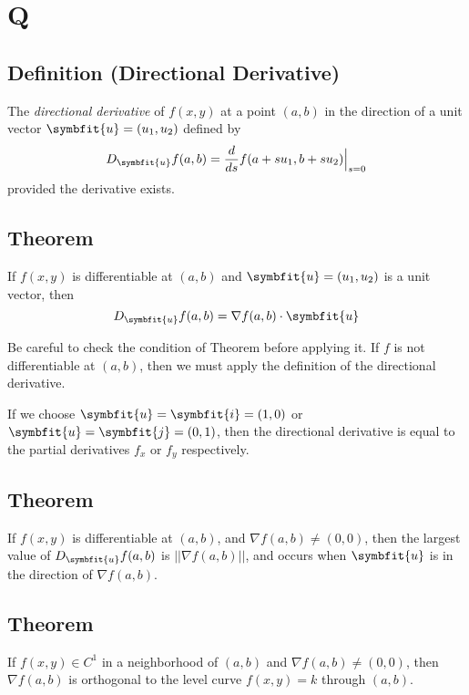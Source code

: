 \section{Q}
\begin{defbox}
\subsection{Definition (Directional Derivative)}
The \emph{directional derivative} of $ f(x,y) $ at a point $ (a,b) $ 
in the direction of a unit vector $ \symbfit{u}=(u_1,u_2) $ 
defined by
\[ D_{\symbfit{u}}f(a,b)=
\frac{d}{ds} f(a+su_1,b+su_2)\Bigr\rvert_{s=0} \]
provided the derivative exists.
\end{defbox}

\begin{thmbox}
\subsection{Theorem}
If $ f(x,y) $ is differentiable at $ (a,b) $ and 
$ \symbfit{u}=(u_1,u_2) $ is a unit vector, then
\[ D_{\symbfit{u}}f(a,b)=\nabla f(a,b) \cdot \symbfit{u} \]
\end{thmbox}

\begin{remark}
    Be careful to check the condition of Theorem before
    applying it. If $ f $ is not differentiable at
    $ (a,b) $, then we must apply the definition of the
    directional derivative.
\end{remark}
\begin{remark}
    If we choose $ \symbfit{u}=\symbfit{i}=(1,0) $ or
    $ \symbfit{u}=\symbfit{j}=(0,1) $, then the directional
    derivative is equal to the partial derivatives $ f_x $ or $ f_y $
    respectively.
\end{remark}

\begin{thmbox}
\subsection{Theorem}
If $ f(x,y) $ is differentiable at $ (a,b) $, and
$ \nabla f(a,b)\neq (0,0) $, then the largest value of
$ D_{\symbfit{u}}f(a,b) $ is $ ||\nabla f(a,b)|| $, and
occurs when $ \symbfit{u} $ is in the direction of
$ \nabla f(a,b) $.
\end{thmbox}

\begin{thmbox}
\subsection{Theorem}
If $ f(x,y)\in C^1 $ in a neighborhood of $ (a,b) $ and
$ \nabla f(a,b)\neq (0,0) $, then $ \nabla f(a,b) $ is
orthogonal to the level curve $ f(x,y)=k $ through
$ (a,b) $.
\end{thmbox}

